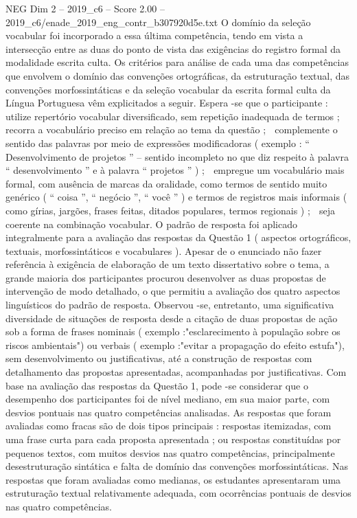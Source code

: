 \begin{textsample}{NEG Dim 2 – 2019\_c6 – Score 2.00 – 2019\_c6/enade\_2019\_eng\_contr\_b307920d5e.txt}
O domínio da seleção vocabular foi incorporado a essa última competência, tendo em vista a intersecção entre as duas do ponto de vista das exigências do registro formal da modalidade escrita culta.
Os critérios para análise de cada uma das competências que envolvem o domínio das convenções ortográficas, da estruturação textual, das convenções morfossintáticas e da seleção vocabular da escrita formal culta da Língua Portuguesa vêm explicitados a seguir.
Espera -se que o participante :  utilize repertório vocabular diversificado, sem repetição inadequada de termos ;  recorra a vocabulário preciso em relação ao tema da questão ;  complemente o sentido das palavras por meio de expressões modificadoras ( exemplo : “ Desenvolvimento de projetos ” – sentido incompleto no que diz respeito à palavra “ desenvolvimento ” e à palavra “ projetos ” ) ;  empregue um vocabulário mais formal, com ausência de marcas da oralidade, como termos de sentido muito genérico ( “ coisa ”, “ negócio ”, “ você ” ) e termos de registros mais informais ( como gírias, jargões, frases feitas, ditados populares, termos regionais ) ;  seja coerente na combinação vocabular.
O padrão de resposta foi aplicado integralmente para a avaliação das respostas da Questão 1 ( aspectos ortográficos, textuais, morfossintáticos e vocabulares ).
Apesar de o enunciado não fazer referência à exigência de elaboração de um texto dissertativo sobre o tema, a grande maioria dos participantes procurou desenvolver as duas propostas de intervenção de modo detalhado, o que permitiu a avaliação dos quatro aspectos linguísticos do padrão de resposta.
Observou -se, entretanto, uma significativa diversidade de situações de resposta desde a citação de duas propostas de ação sob a forma de frases nominais ( exemplo :"esclarecimento à população sobre os riscos ambientais") ou verbais ( exemplo :"evitar a propagação do efeito estufa"), sem desenvolvimento ou justificativas, até a construção de respostas com detalhamento das propostas apresentadas, acompanhadas por justificativas.
Com base na avaliação das respostas da Questão 1, pode -se considerar que o desempenho dos participantes foi de nível mediano, em sua maior parte, com desvios pontuais nas quatro competências analisadas.
As respostas que foram avaliadas como fracas são de dois tipos principais : respostas itemizadas, com uma frase curta para cada proposta apresentada ; ou respostas constituídas por pequenos textos, com muitos desvios nas quatro competências, principalmente desestruturação sintática e falta de domínio das convenções morfossintáticas.
Nas respostas que foram avaliadas como medianas, os estudantes apresentaram uma estruturação textual relativamente adequada, com ocorrências pontuais de desvios nas quatro competências.

\end{textsample}

